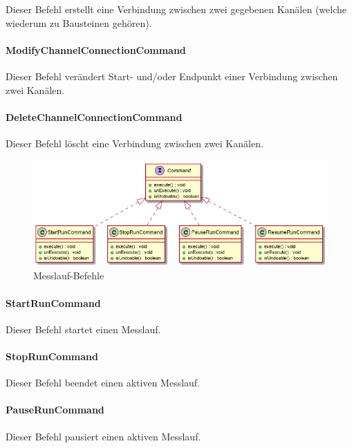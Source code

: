 \documentclass[parskip=full]{scrartcl}
\begin{document}
Dieser Befehl erstellt eine Verbindung zwischen zwei gegebenen Kanälen (welche wiederum zu Bausteinen gehören).

\paragraph{ModifyChannelConnectionCommand}

Dieser Befehl verändert Start- und/oder Endpunkt einer Verbindung zwischen zwei Kanälen.

\paragraph{DeleteChannelConnectionCommand}

Dieser Befehl löscht eine Verbindung zwischen zwei Kanälen.

\begin{figure}[htbp]
	\begin{center}
		\includegraphics[width = 12cm]{Grafiken/Commands3.png}
		\caption{Messlauf-Befehle}
		\label{Commands3}
	\end{center}
\end{figure}

\paragraph{StartRunCommand}

Dieser Befehl startet einen Messlauf.

\paragraph{StopRunCommand}

Dieser Befehl beendet einen aktiven Messlauf.

\paragraph{PauseRunCommand}

Dieser Befehl pausiert einen aktiven Messlauf.
\end{document}
